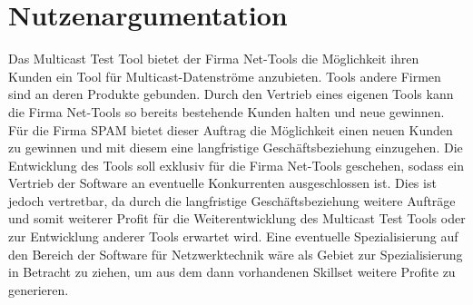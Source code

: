 \section{Nutzenargumentation}
Das Multicast Test Tool bietet der Firma Net-Tools die Möglichkeit ihren Kunden ein
Tool für Multicast-Datenströme anzubieten. Tools andere Firmen sind an deren
Produkte gebunden. Durch den Vertrieb eines eigenen Tools kann die Firma
Net-Tools so bereits bestehende Kunden halten und neue gewinnen.\newline
\newline
Für die Firma SPAM bietet dieser Auftrag die Möglichkeit einen neuen Kunden zu
gewinnen und mit diesem eine langfristige Geschäftsbeziehung einzugehen. Die Entwicklung
des Tools soll exklusiv für die Firma Net-Tools geschehen, sodass ein Vertrieb
der Software an eventuelle Konkurrenten ausgeschlossen ist. Dies ist jedoch
vertretbar, da durch die langfristige Geschäftsbeziehung weitere Aufträge und
somit weiterer Profit für die Weiterentwicklung des Multicast Test Tools oder zur
Entwicklung anderer Tools erwartet wird.\newline
Eine eventuelle Spezialisierung auf den Bereich der Software für Netzwerktechnik
wäre als Gebiet zur Spezialisierung in Betracht zu ziehen, um aus dem dann
vorhandenen Skillset weitere Profite zu generieren.
